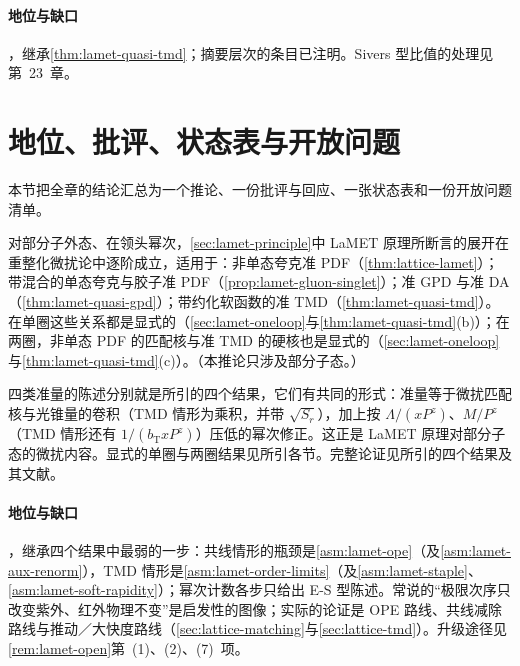 \paragraph{地位与缺口}
\tagA，继承\cref{thm:lamet-quasi-tmd}；摘要层次的条目已注明。Sivers 型比值的处理见第~23~章。

\section{地位、批评、状态表与开放问题}\label{sec:lattice-status}

本节把全章的结论汇总为一个推论、一份批评与回应、一张状态表和一份开放问题清单。

\begin{corollary}\label{cor:lamet-principle-pt}
对部分子外态、在领头幂次，\cref{sec:lamet-principle}中 LaMET 原理所断言的展开在重整化微扰论中逐阶成立，适用于：非单态夸克准 PDF（\cref{thm:lattice-lamet}）；带混合的单态夸克与胶子准 PDF（\cref{prop:lamet-gluon-singlet}）；准 GPD 与准 DA（\cref{thm:lamet-quasi-gpd}）；带约化软函数的准 TMD（\cref{thm:lamet-quasi-tmd}）。在单圈这些关系都是显式的（\cref{sec:lamet-oneloop}与\cref{thm:lamet-quasi-tmd}(b)）；在两圈，非单态 PDF 的匹配核与准 TMD 的硬核也是显式的（\cref{sec:lamet-oneloop}与\cref{thm:lamet-quasi-tmd}(c)）。（本推论只涉及部分子态。）
\end{corollary}

\begin{proofsketch}
四类准量的陈述分别就是所引的四个结果，它们有共同的形式：准量等于微扰匹配核与光锥量的卷积（TMD 情形为乘积，并带 $\sqrt{S_r}$），加上按 $\Lambda/(xP^z)$、$M/P^z$（TMD 情形还有 $1/(b_{\mathrm T}xP^z)$）压低的幂次修正。这正是 LaMET 原理对部分子态的微扰内容。显式的单圈与两圈结果见所引各节。完整论证见所引的四个结果及其文献。
\end{proofsketch}

\paragraph{地位与缺口}
\tagA，继承四个结果中最弱的一步：共线情形的瓶颈是\cref{asm:lamet-ope}（及\cref{asm:lamet-aux-renorm}），TMD 情形是\cref{asm:lamet-order-limits}（及\cref{asm:lamet-staple}、\cref{asm:lamet-soft-rapidity}）；幂次计数各步只给出 E-S 型陈述。常说的“极限次序只改变紫外、红外物理不变”是启发性的图像；实际的论证是 OPE 路线、共线减除路线与推动／大快度路线（\cref{sec:lattice-matching}与\cref{sec:lattice-tmd}）。升级途径见\cref{rem:lamet-open}第~(1)、(2)、(7)~项。

